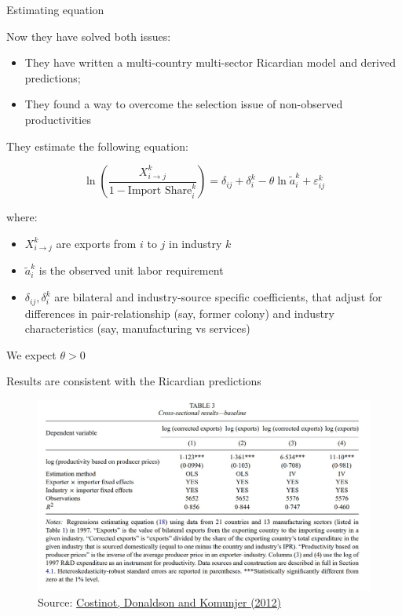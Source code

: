 \documentclass[notes,11pt, aspectratio=169, xcolor=table]{beamer}
\newenvironment{wideitemize}{\itemize\addtolength{\itemsep}{10pt}}{\enditemize}
\begin{document}
\begin{frame}{Estimating equation}
\begin{wideitemize}
    \item Now they have solved both issues:
    \begin{itemize}
        \item They have written a multi-country multi-sector Ricardian model and derived predictions; 
        \item They found a way to overcome the selection issue of non-observed productivities
    \end{itemize}
    \item They estimate the following equation:

    \begin{equation*}
    \ln \left( \frac{X_{i \to j}^k}{ 1-\text{Import Share}_i^k} \right) = \delta_{ij} + \delta^k_{i} - \theta \ln \tilde{a}_i^k + \varepsilon^k_{ij}
    \end{equation*}

    \noindent where:

    \begin{itemize}
        \item $X_{i \to j}^k$ are exports from $i$ to $j$ in industry $k$
        \item $\tilde{a}_i^k$ is the observed unit labor requirement
        \item $\delta_{ij}, \delta^k_{i}$ are bilateral and industry-source specific coefficients, that adjust for differences in pair-relationship (say, former colony) and industry characteristics (say, manufacturing vs services)
    \end{itemize}

    \item We expect $\theta > 0$
    
\end{wideitemize}

\end{frame}


\begin{frame}{Results are consistent with the Ricardian predictions}
    \begin{figure}
        \centering
        \includegraphics[width=0.6\linewidth]{figs/cdk1.jpg}
        \caption{Source: \href{https://academic.oup.com/restud/article/79/2/581/1532037}{Costinot, Donaldson and Komunjer (2012)} }
        \label{fig:cdk1}
    \end{figure}
\end{frame}
\end{document}

